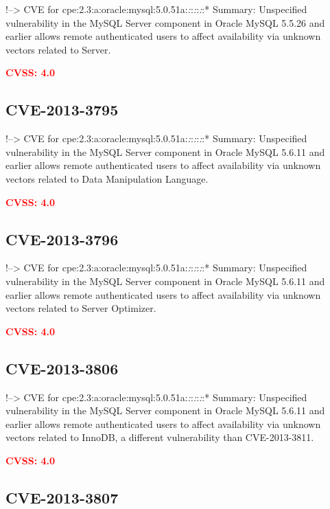 \documentclass[a4paper, 12pt]{article}
\begin{document}
!--\textgreater{} CVE for
cpe:2.3:a:oracle:mysql:5.0.51a:\emph{:}:\emph{:}:\emph{:}:* Summary:
Unspecified vulnerability in the MySQL Server component in Oracle MySQL
5.5.26 and earlier allows remote authenticated users to affect
availability via unknown vectors related to Server.

\textbf{\textcolor{red}{CVSS: 4.0}}

\hypertarget{cve-2013-3795}{%
\subsection{CVE-2013-3795}\label{cve-2013-3795}}

!--\textgreater{} CVE for
cpe:2.3:a:oracle:mysql:5.0.51a:\emph{:}:\emph{:}:\emph{:}:* Summary:
Unspecified vulnerability in the MySQL Server component in Oracle MySQL
5.6.11 and earlier allows remote authenticated users to affect
availability via unknown vectors related to Data Manipulation Language.

\textbf{\textcolor{red}{CVSS: 4.0}}

\hypertarget{cve-2013-3796}{%
\subsection{CVE-2013-3796}\label{cve-2013-3796}}

!--\textgreater{} CVE for
cpe:2.3:a:oracle:mysql:5.0.51a:\emph{:}:\emph{:}:\emph{:}:* Summary:
Unspecified vulnerability in the MySQL Server component in Oracle MySQL
5.6.11 and earlier allows remote authenticated users to affect
availability via unknown vectors related to Server Optimizer.

\textbf{\textcolor{red}{CVSS: 4.0}}

\hypertarget{cve-2013-3806}{%
\subsection{CVE-2013-3806}\label{cve-2013-3806}}

!--\textgreater{} CVE for
cpe:2.3:a:oracle:mysql:5.0.51a:\emph{:}:\emph{:}:\emph{:}:* Summary:
Unspecified vulnerability in the MySQL Server component in Oracle MySQL
5.6.11 and earlier allows remote authenticated users to affect
availability via unknown vectors related to InnoDB, a different
vulnerability than CVE-2013-3811.

\textbf{\textcolor{red}{CVSS: 4.0}}

\hypertarget{cve-2013-3807}{%
\subsection{CVE-2013-3807}\label{cve-2013-3807}}
\end{document}
